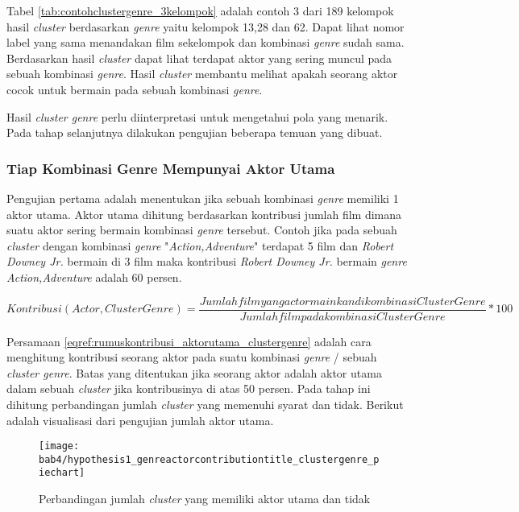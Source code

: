 Tabel \ref{tab:contohclustergenre_3kelompok} adalah contoh 3 dari 189 kelompok hasil \textit{cluster} berdasarkan \textit{genre} yaitu kelompok 13,28 dan 62. Dapat lihat nomor label yang sama menandakan film sekelompok dan kombinasi \textit{genre} sudah sama. Berdasarkan hasil \textit{cluster} dapat lihat terdapat aktor yang sering muncul pada sebuah kombinasi \textit{genre}. Hasil \textit{cluster} membantu melihat apakah seorang aktor cocok untuk bermain pada sebuah kombinasi \textit{genre}.

Hasil \textit{cluster genre} perlu diinterpretasi  untuk mengetahui pola yang menarik. Pada tahap selanjutnya dilakukan pengujian beberapa temuan yang dibuat.

\subsubsection{Tiap Kombinasi Genre Mempunyai Aktor Utama}  

Pengujian pertama adalah menentukan jika sebuah kombinasi \textit{genre} memiliki 1 aktor utama. Aktor utama dihitung berdasarkan kontribusi jumlah film dimana suatu aktor sering bermain kombinasi \textit{genre} tersebut. Contoh jika pada sebuah \textit{cluster} dengan kombinasi \textit{genre} "\textit{Action,Adventure}" terdapat 5 film dan \textit{Robert Downey Jr.} bermain di 3 film maka kontribusi \textit{Robert Downey Jr.} bermain \textit{genre} \textit{Action,Adventure} adalah 60 persen. 


\begin{equation}
Kontribusi(Actor,ClusterGenre) = \frac{Jumlah film yang actor mainkan di kombinasi ClusterGenre}{Jumlah film pada kombinasi ClusterGenre} * 100 
\label{eqref:rumuskontribusi_aktorutama_clustergenre}
\end{equation}

Persamaan \ref{eqref:rumuskontribusi_aktorutama_clustergenre}
 adalah cara menghitung kontribusi seorang aktor pada suatu kombinasi \textit{genre} / sebuah \textit{cluster genre}. Batas yang ditentukan jika seorang aktor adalah aktor utama dalam sebuah \textit{cluster} jika kontribusinya di atas 50 persen. Pada tahap ini dihitung perbandingan jumlah \textit{cluster} yang memenuhi syarat dan tidak. Berikut adalah visualisasi dari pengujian jumlah aktor utama. 
 
 
 
\begin{figure}[H]
	\centering  
	\texttt{[image: bab4/hypothesis1\_genreactorcontributiontitle\_clustergenre\_piechart]}   
	\caption{Perbandingan jumlah \textit{cluster} yang memiliki aktor utama dan tidak }	\label{fig:hypothesis1_genreactorcontributiontitle_clustergenre_piechart} 
\end{figure}

